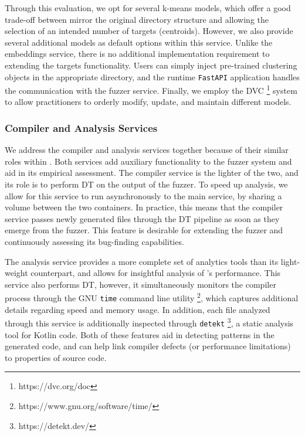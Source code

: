 
Through this evaluation, we opt for several k-means models, which offer a good
trade-off between mirror the original directory structure and allowing
the selection of an intended number of targets (centroids).
However, we also provide several additional models as default options within this service.
Unlike the embeddings service, there is no additional implementation requirement
to extending the targets functionality.
Users can simply inject pre-trained
clustering objects in the appropriate directory,
and the runtime \texttt{FastAPI} application handles the communication with the fuzzer service.
Finally, we employ the \gls{DVC} \footnote{https://dvc.org/doc}
system to allow practitioners to orderly
modify, update, and maintain different models.

\subsubsection{Compiler and Analysis Services}

We address the compiler and analysis services together because
of their similar roles within \kf.
Both services add auxiliary functionality to the fuzzer system
and aid in its empirical assessment.
The compiler service is the lighter of the two,
and its role is to perform \gls{DT} on the
output of the fuzzer.
To speed up analysis, we allow for this service to run asynchronously
to the main service, by sharing a volume between the two containers.
In practice, this means that the compiler service passes newly
generated files through the \gls{DT} pipeline as soon as they emerge
from the fuzzer.
This feature is desirable for extending the fuzzer and continuously assessing
its bug-finding capabilities.

The analysis service provides a more complete set of analytics
tools than its light-weight counterpart, and allows
for insightful analysis of \kf 's performance.
This service also performs \gls{DT}, however, it simultaneously
monitors the compiler process through the GNU \texttt{time}
command line utility \footnote{https://www.gnu.org/software/time/},
which captures additional details regarding speed and memory usage.
In addition, each file analyzed through this service is additionally inspected
through \texttt{detekt} \footnote{https://detekt.dev/}, a static analysis
tool for Kotlin code.
Both of these features aid in detecting patterns in the generated code,
and can help link compiler defects (or performance limitations)
to properties of source code.

